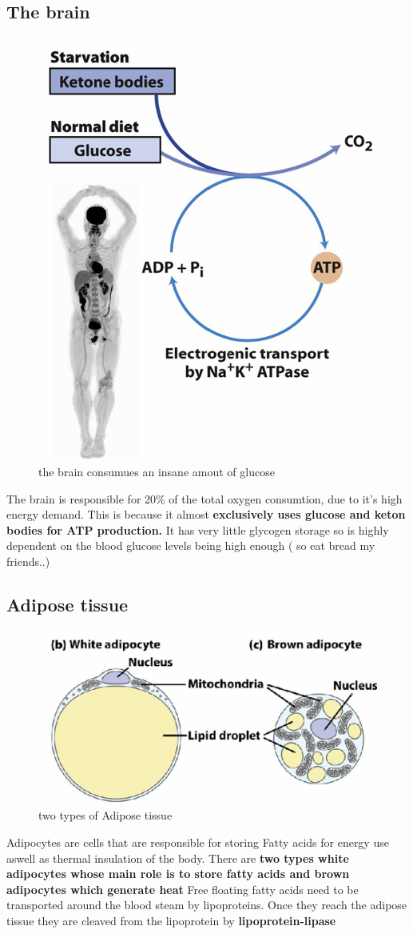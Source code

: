 \documentclass[../main.tex]{subfiles}
\begin{document}
\subsection{The brain}
\begin{figure}[H]
    \centering
    \includegraphics[width=0.5\linewidth]{theBrain.png}
    \caption{the brain consumues an insane amout of glucose}
    \label{fig:enter-label}
\end{figure}
The brain is responsible for 20\% of the total oxygen consumtion, due to it's high energy demand. This is because it almost\textbf{ exclusively uses glucose and keton bodies for ATP production.} It has very little glycogen storage so is highly dependent on the blood glucose levels being high enough ( so eat bread my friends..)
\subsection{Adipose tissue}
\begin{figure}[H]
    \centering
    \includegraphics[width=0.5\linewidth]{adiposeTissue.png}
    \caption{two types of Adipose tissue}
    \label{fig:enter-label}
\end{figure}
Adipocytes are cells that are responsible for storing Fatty acids for energy use aswell as thermal insulation of the body. There are \textbf{two types white adipocytes whose main role is to store fatty acids and brown adipocytes which generate heat} Free floating fatty acids need to be transported around the blood steam by lipoproteins. Once they reach the adipose tissue they are cleaved from the lipoprotein by \textbf{\gls{lipoprotein-lipase}}
\end{document}
